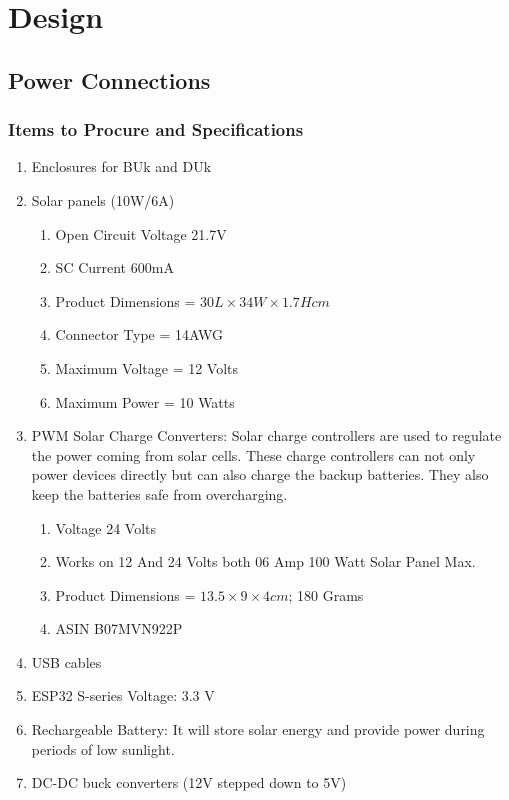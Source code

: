 \documentclass[12pt]{article} %
\begin{document}
\clearpage
\section{Design}
\subsection{Power Connections}
\subsubsection{Items to Procure and Specifications}
\begin{enumerate}
    \item Enclosures for BUk and DUk
    \item Solar panels (10W/6A)
    \begin{enumerate}
        \item  Open Circuit Voltage 21.7V
        \item SC Current 600mA
        \item Product Dimensions = $30L \times 34W \times 1.7H cm$
        \item Connector Type = 14AWG
        \item Maximum Voltage = 12 Volts
        \item Maximum Power	= 10 Watts
    \end{enumerate}
    \item \acrshort{PWM} Solar Charge Converters: Solar charge controllers are used to regulate the power coming from solar cells. These charge controllers can not only power devices directly but can also charge the backup batteries. They also keep the batteries safe from overcharging. 
    \begin{enumerate}
        \item Voltage 24 Volts
        \item Works on 12 And 24 Volts both 06 Amp 100 Watt Solar Panel Max.
        \item Product Dimensions = $13.5 \times 9 \times 4 cm$; 180 Grams
        \item ASIN	B07MVN922P
    \end{enumerate}
    \item USB cables
    \item ESP32 S-series Voltage: 3.3 V
    \item Rechargeable Battery: It will store solar energy and provide power during periods of low sunlight.
    \item DC-DC buck converters (12V stepped down to 5V)
\end{enumerate}
\end{document}
